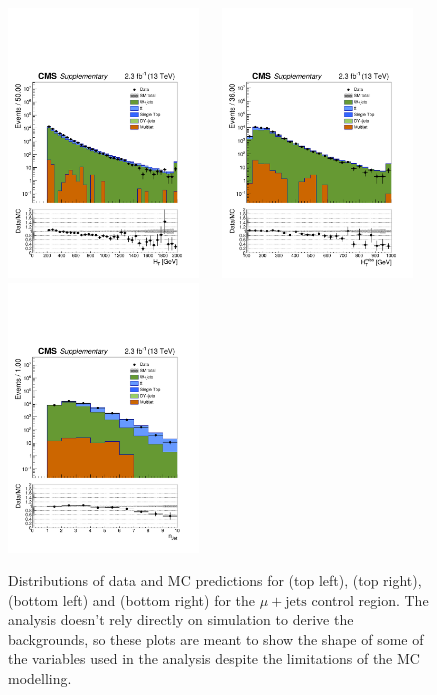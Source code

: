 \clearpage
\begin{figure}[tbhp]
    \caption{ 
    Distributions of data and MC predictions for \scalht (top left), \mht (top right), \nj (bottom left) and \nb (bottom right) 
    for the $\mu+\mathrm{jets}$ control region. 
    The analysis doesn't rely directly on simulation to derive the backgrounds, 
    so these plots are meant to show the shape of some of the variables used in the analysis despite the limitations 
    of the MC modelling. 
    \label{fig:data-MC_plots_SingleMu} }
  \begin{center}
     \includegraphics[width=0.45\textwidth]{figures/SingleMu_ht40_all_all} ~~
     \includegraphics[width=0.45\textwidth]{figures/SingleMu_mht40_pt_all_all} \\
     \includegraphics[width=0.45\textwidth]{figures/SingleMu_nJet40_all_all} ~~

\end{center}
\end{figure}
